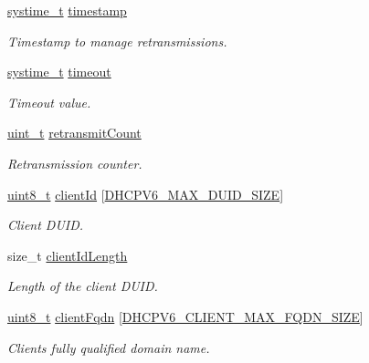 \begin{DoxyCompactItemize}
\hyperlink{compiler__port_8h_ae3e32a98d431a02106616da3071832dd}{systime\+\_\+t} \hyperlink{struct__Dhcpv6ClientContext_a056d92033c7e833e88b8db808657f920}{timestamp}
\begin{DoxyCompactList}\small\item\em Timestamp to manage retransmissions. \end{DoxyCompactList}\item 
\hyperlink{compiler__port_8h_ae3e32a98d431a02106616da3071832dd}{systime\+\_\+t} \hyperlink{struct__Dhcpv6ClientContext_ab56d35b1f2566414ae523d4714996b64}{timeout}
\begin{DoxyCompactList}\small\item\em Timeout value. \end{DoxyCompactList}\item 
\hyperlink{compiler__port_8h_a12a1e9b3ce141648783a82445d02b58d}{uint\+\_\+t} \hyperlink{struct__Dhcpv6ClientContext_ae2898d84cdbbf5836370c4f124133daf}{retransmit\+Count}
\begin{DoxyCompactList}\small\item\em Retransmission counter. \end{DoxyCompactList}\item 
\hyperlink{stdint_8h_aba7bc1797add20fe3efdf37ced1182c5}{uint8\+\_\+t} \hyperlink{struct__Dhcpv6ClientContext_a964d27a469052a5b2d888533b5ba72c1}{client\+Id} \mbox{[}\hyperlink{dhcpv6__common_8h_aa05ad3ad9a83e2486fbb7f86838fffb9}{D\+H\+C\+P\+V6\+\_\+\+M\+A\+X\+\_\+\+D\+U\+I\+D\+\_\+\+S\+I\+ZE}\mbox{]}
\begin{DoxyCompactList}\small\item\em Client D\+U\+ID. \end{DoxyCompactList}\item 
size\+\_\+t \hyperlink{struct__Dhcpv6ClientContext_a1c568c3687617cfba7d8961f43b3dfcd}{client\+Id\+Length}
\begin{DoxyCompactList}\small\item\em Length of the client D\+U\+ID. \end{DoxyCompactList}\item 
\hyperlink{stdint_8h_aba7bc1797add20fe3efdf37ced1182c5}{uint8\+\_\+t} \hyperlink{struct__Dhcpv6ClientContext_aadfc863a8dab30c8eafc78c909e84762}{client\+Fqdn} \mbox{[}\hyperlink{dhcpv6__client_8h_aec663ebfadf8f576b3b5b2b68b97678e}{D\+H\+C\+P\+V6\+\_\+\+C\+L\+I\+E\+N\+T\+\_\+\+M\+A\+X\+\_\+\+F\+Q\+D\+N\+\_\+\+S\+I\+ZE}\mbox{]}
\begin{DoxyCompactList}\small\item\em Client\textquotesingle{}s fully qualified domain name. \end{DoxyCompactList}\item 

\end{DoxyCompactItemize}
